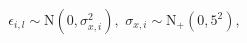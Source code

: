 \begin{equation}
  \epsilon_{i, l} \sim \text{N}(0, \sigma^{2}_{x, i}),  \,\, \sigma_{x, i} \sim \text{N}_{+}(0, 5^2),
\end{equation}